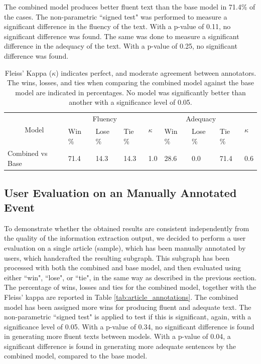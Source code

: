 \documentclass[
hf, %
]{ceurart}
\begin{document}
The combined model produces better fluent text than the base model in 71.4\% of the cases. The non-parametric ``signed test" was performed to measure a significant difference in the fluency of the text. With a p-value of 0.11, no significant difference was found. The same was done to measure a significant difference in the adequacy of the text. With a p-value of 0.25, no significant difference was found.

\begin{table}[ht]
\centering
\begin{tabular}{|c|lll|l|lll|l|}
\hline
\multirow{2}{*}{Model}                 & \multicolumn{3}{c|}{Fluency}                                     & \multirow{2}{*}{$\kappa$} & \multicolumn{3}{c|}{Adequacy}                                    & \multirow{2}{*}{$\kappa$} \\ \cline{2-4} \cline{6-8}
                                       & \multicolumn{1}{l|}{Win \%} & \multicolumn{1}{l|}{Lose \%} & Tie \% &                    & \multicolumn{1}{l|}{Win \%} & \multicolumn{1}{l|}{Lose \%} & Tie \% &                    \\ \hline
\multicolumn{1}{|l|}{Combined vs Base} & \multicolumn{1}{l|}{71.4}  & \multicolumn{1}{l|}{14.3}   & 14.3  & 1.0                & \multicolumn{1}{l|}{28.6}  & \multicolumn{1}{l|}{0.0}    & 71.4  & 0.6                \\ \hline
\end{tabular}
\caption{Fleiss' Kappa ($\kappa$) indicates perfect, and moderate agreement between annotators. The wins, losses, and ties when comparing the combined model against the base model are indicated in percentages. No model was significantly better than another with a significance level of 0.05.}
\label{tab:event_annotations}
\end{table}

\subsection{User Evaluation on an Manually Annotated Event}
\label{sec:result_gen_event}
To demonstrate whether the obtained results are consistent independently from the quality of the information extraction output, we decided to perform a user evaluation on a single article (sample), which has been manually annotated by users, which handcrafted the resulting subgraph. This subgraph has been processed with both the combined and base model, and then evaluated using either ``win", ``lose", or ``tie", in the same way as described in the previous section. The percentage of wins, losses and ties for the combined model, together with the Fleiss' kappa are reported in Table \ref{tab:article_annotations}. The combined model has been assigned more wins for producing fluent and adequate text. The non-parametric ``signed test" is applied to test if this is significant, again, with a significance level of 0.05. With a p-value of 0.34, no significant difference is found in generating more fluent texts between models. With a p-value of 0.04, a significant difference is found in generating more adequate sentences by the combined model, compared to the base model.
\end{document}
